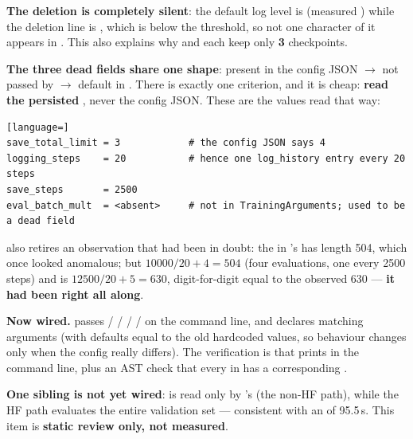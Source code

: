 \documentclass[11pt,openany]{article}
\begin{document}
\textbf{The deletion is completely silent}: the default  log level is
 (measured ) while the
deletion line is
, which is
below the threshold, so not one character of it appears in
. This also explains why  and
 each keep only \textbf{3} checkpoints.

\textbf{The three dead fields share one shape}: present in the config JSON $\rightarrow$ not
passed by  $\rightarrow$ default in . There is exactly one
criterion, and it is cheap: \textbf{read the persisted }, never the
config JSON. These are the values read that way:

\begin{lstlisting}[language=]
save_total_limit = 3            # the config JSON says 4
logging_steps    = 20           # hence one log_history entry every 20 steps
save_steps       = 2500
eval_batch_mult  = <absent>     # not in TrainingArguments; used to be a dead field
\end{lstlisting}

 also retires an observation that had been in doubt: the
 in 's  has length 504,
which once looked anomalous; but $10000/20 + 4 = 504$ (four evaluations, one every 2500
steps) and  is $12500/20 + 5 = 630$, digit-for-digit equal to the
observed 630 --- \textbf{it had been right all along}.

\textbf{Now wired.}  passes  /  /
 /  /  on the command line, and
 declares matching arguments (with defaults equal to the old hardcoded values,
so behaviour changes only when the config really differs). The verification is that
 prints  in the command
line, plus an AST check that every  in  has a corresponding
.

\textbf{One sibling is not yet wired}:  is read only by
's  (the non-HF path), while the HF  path
evaluates the entire validation set --- consistent with an  of 95.5\,s.
This item is \textbf{static review only, not measured}.
\end{document}
